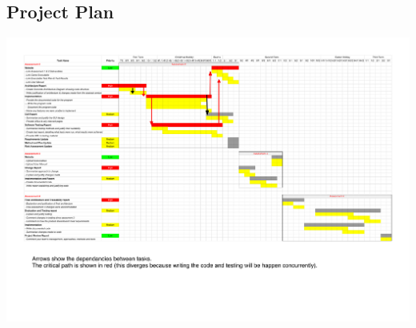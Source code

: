\begin{landscape}
	\section{Project Plan}
	\includegraphics[width=9.85in]{plan.pdf}
\end{landscape}


